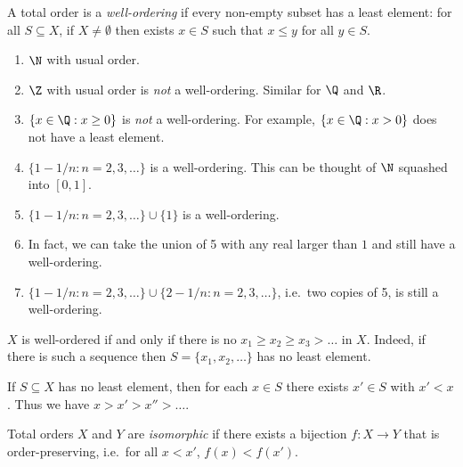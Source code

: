 \documentclass[a4paper]{article}
\begin{document}
\begin{definition}
  A total order is a \emph{well-ordering} if every non-empty subset has a least element: for all \(S \subseteq X\), if \(X \neq \emptyset\) then exists \(x \in S\) such that \(x \leq y\) for all \(y \in S\).
\end{definition}

\begin{eg}\leavevmode
  \begin{enumerate}
  \item \(\N\) with usual order.
  \item \(\Z\) with usual order is \emph{not} a well-ordering. Similar for \(\Q\) and \(\R\).
  \item \(\{x \in \Q: x \geq 0\}\) is \emph{not} a well-ordering. For example, \(\{x \in \Q: x > 0\}\) does not have a least element.
  \item \(\{1 - 1/n: n = 2, 3, \dots\}\) is a well-ordering. This can be thought of \(\N\) squashed into \([0, 1]\).
  \item \(\{1 - 1/n: n = 2, 3, \dots\} \cup \{1\}\) is a well-ordering.
  \item In fact, we can take the union of 5 with any real larger than \(1\) and still have a well-ordering.
  \item \(\{1 - 1/n: n = 2, 3, \dots\} \cup \{2 - 1/n: n = 2, 3, \dots\}\), i.e.\ two copies of 5, is still a well-ordering.
  \end{enumerate}
\end{eg}

\begin{remark}
  \(X\) is well-ordered if and only if there is no \(x_1 \geq x_2 \geq x_3 > \dots\) in \(X\). Indeed, if there is such a sequence then \(S = \{x_1, x_2, \dots\}\) has no least element.
\end{remark}

\begin{corollary}
  If \(S \subseteq X\) has no least element, then for each \(x \in S\) there exists \(x' \in S\) with \(x' < x\). Thus we have \(x > x' > x'' > \dots\).
\end{corollary}

\begin{definition}
  Total orders \(X\) and \(Y\) are \emph{isomorphic} if there exists a bijection \(f: X \to Y\) that is order-preserving, i.e.\ for all \(x < x'\), \(f(x) < f(x')\).
\end{definition}
\end{document}
